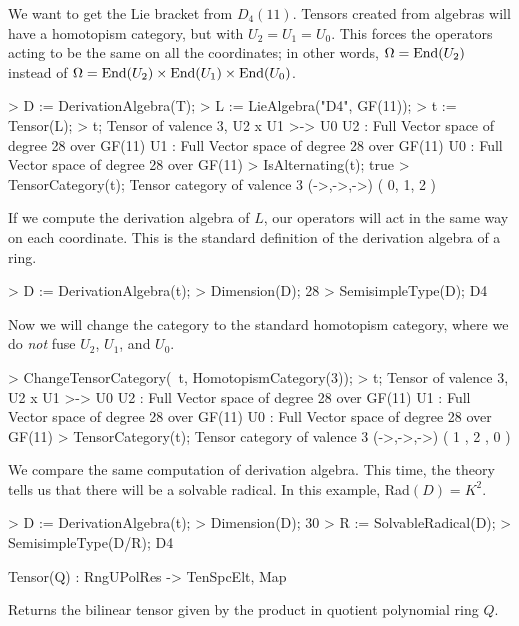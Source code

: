 \begin{example}[D4LieAlgebra]

We want to get the Lie bracket from $D_4(11)$. 
Tensors created from algebras will have a homotopism category, but with $U_2=U_1=U_0$. 
This forces the operators acting to be the same on all the coordinates; in other words, $\Omega=\operatorname{End}(U_2)$ instead of $\Omega=\operatorname{End}(U_2)\times\operatorname{End}(U_1)\times\operatorname{End}(U_0)$. 
\begin{code}
> D := DerivationAlgebra(T);
> L := LieAlgebra("D4", GF(11));
> t := Tensor(L);
> t;
Tensor of valence 3, U2 x U1 >-> U0
U2 : Full Vector space of degree 28 over GF(11)
U1 : Full Vector space of degree 28 over GF(11)
U0 : Full Vector space of degree 28 over GF(11)
> IsAlternating(t);
true
> TensorCategory(t);
Tensor category of valence 3 (->,->,->) ({ 0, 1, 2 })
\end{code}

If we compute the derivation algebra of $L$, our operators will act in the same way on each coordinate.
This is the standard definition of the derivation algebra of a ring.
\begin{code}
> D := DerivationAlgebra(t);
> Dimension(D);
28
> SemisimpleType(D);
D4
\end{code}

Now we will change the category to the standard homotopism category, where we do \emph{not} fuse $U_2$, $U_1$, and $U_0$. 
\begin{code}
> ChangeTensorCategory(~t, HomotopismCategory(3));
> t;
Tensor of valence 3, U2 x U1 >-> U0
U2 : Full Vector space of degree 28 over GF(11)
U1 : Full Vector space of degree 28 over GF(11)
U0 : Full Vector space of degree 28 over GF(11)
> TensorCategory(t);
Tensor category of valence 3 (->,->,->) ({ 1 },{ 2 },{ 0 })
\end{code}

We compare the same computation of derivation algebra. 
This time, the theory tells us that there will be a solvable radical.
In this example, Rad$(D)=K^2$. 
\begin{code}
> D := DerivationAlgebra(t);
> Dimension(D);
30
> R := SolvableRadical(D);
> SemisimpleType(D/R);
D4
\end{code}
\end{example}

\begin{intrinsics}
Tensor(Q) : RngUPolRes -> TenSpcElt, Map
\end{intrinsics}

Returns the bilinear tensor given by the product in quotient polynomial ring $Q$.

